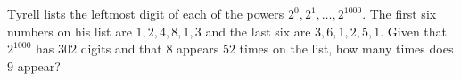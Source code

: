 Tyrell lists the leftmost digit of each of the powers $2^0,2^1,\dots,2^{1000}$. The first six numbers on his list are $1,2,4,8,1,3$ and the last six are $3,6,1,2,5,1$. Given that $2^{1000}$ has $302$ digits and that $8$ appears $52$ times on the list, how many times does $9$ appear?
